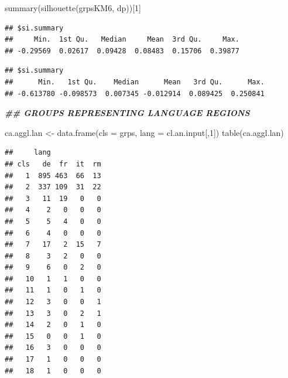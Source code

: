 \documentclass[
]{article}
\newenvironment{Shaded}{\begin{snugshade}}{\end{snugshade}}
\newcommand{\AttributeTok}[1]{\textcolor[rgb]{0.77,0.63,0.00}{#1}}
\newcommand{\DecValTok}[1]{\textcolor[rgb]{0.00,0.00,0.81}{#1}}
\newcommand{\DocumentationTok}[1]{\textcolor[rgb]{0.56,0.35,0.01}{\textbf{\textit{#1}}}}
\newcommand{\FunctionTok}[1]{\textcolor[rgb]{0.00,0.00,0.00}{#1}}
\newcommand{\NormalTok}[1]{#1}
\newcommand{\OtherTok}[1]{\textcolor[rgb]{0.56,0.35,0.01}{#1}}
\newcommand{\SpecialCharTok}[1]{\textcolor[rgb]{0.00,0.00,0.00}{#1}}
\begin{document}
\begin{Shaded}
\begin{Highlighting}[]
\FunctionTok{summary}\NormalTok{(}\FunctionTok{silhouette}\NormalTok{(grpsKM6, dp))[}\DecValTok{1}\NormalTok{]}
\end{Highlighting}
\end{Shaded}

\begin{verbatim}
## $si.summary
##     Min.  1st Qu.   Median     Mean  3rd Qu.     Max. 
## -0.29569  0.02617  0.09428  0.08483  0.15706  0.39877
\end{verbatim}

\begin{Shaded}
\end{Shaded}

\begin{verbatim}
## $si.summary
##      Min.   1st Qu.    Median      Mean   3rd Qu.      Max. 
## -0.613780 -0.098573  0.007345 -0.012914  0.089425  0.250841
\end{verbatim}

\begin{Shaded}
\begin{Highlighting}[]
\DocumentationTok{\#\# GROUPS REPRESENTING LANGUAGE REGIONS}

\NormalTok{ca.aggl.lan }\OtherTok{\textless{}{-}} \FunctionTok{data.frame}\NormalTok{(}\AttributeTok{cls =}\NormalTok{ grps, }\AttributeTok{lang =}\NormalTok{ cl.an.input[,}\DecValTok{1}\NormalTok{])}
\FunctionTok{table}\NormalTok{(ca.aggl.lan)}
\end{Highlighting}
\end{Shaded}

\begin{verbatim}
##     lang
## cls   de  fr  it  rm
##   1  895 463  66  13
##   2  337 109  31  22
##   3   11  19   0   0
##   4    2   0   0   0
##   5    5   4   0   0
##   6    4   0   0   0
##   7   17   2  15   7
##   8    3   2   0   0
##   9    6   0   2   0
##   10   1   1   0   0
##   11   1   0   1   0
##   12   3   0   0   1
##   13   3   0   2   1
##   14   2   0   1   0
##   15   0   0   1   0
##   16   3   0   0   0
##   17   1   0   0   0
##   18   1   0   0   0
\end{verbatim}
\end{document}
